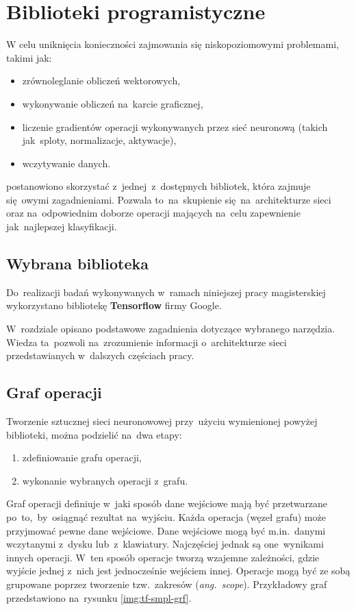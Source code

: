 \chapter{Biblioteki programistyczne}
W celu uniknięcia konieczności zajmowania się niskopoziomowymi problemami, takimi jak:
\begin{itemize}
    \item zrównoleglanie obliczeń wektorowych,
    \item wykonywanie obliczeń na~karcie graficznej,
    \item liczenie gradientów operacji wykonywanych przez sieć neuronową (takich jak~sploty, normalizacje, aktywacje),
    \item wczytywanie danych.
\end{itemize}
postanowiono skorzystać z~jednej~z~dostępnych bibliotek, która zajmuje się~owymi zagadnieniami. Pozwala to~na~skupienie
się~na~architekturze sieci oraz na~odpowiednim doborze operacji mających na~celu zapewnienie jak~najlepszej
klasyfikacji.

\section{Wybrana biblioteka}
Do~realizacji badań wykonywanych w~ramach niniejszej pracy magisterskiej wykorzystano bibliotekę
\textbf{Tensorflow} firmy Google.

W~rozdziale opisano podstawowe zagadnienia dotyczące wybranego narzędzia. Wiedza ta~pozwoli na~zrozumienie
informacji o~architekturze sieci przedstawianych w~dalszych częściach pracy.

\section{Graf operacji}
Tworzenie sztucznej sieci neuronowowej przy~użyciu wymienionej powyżej biblioteki, można podzielić na~dwa etapy:
\begin{enumerate}
    \item zdefiniowanie grafu operacji,
    \item wykonanie wybranych operacji z~grafu.
\end{enumerate}

Graf operacji definiuje w~jaki sposób dane wejściowe mają być przetwarzane po~to,~by~osiągnąć rezultat na~wyjściu.
Każda operacja (węzeł grafu) może przyjmować pewne dane wejściowe. Dane wejściowe mogą być m.in.~danymi wczytanymi
z~dysku lub~z~klawiatury. Najczęściej jednak są one~wynikami innych operacji. W~ten sposób operacje tworzą wzajemne
zależności, gdzie wyjście jednej z~nich jest jednocześnie wejściem innej. Operacje mogą być ze sobą grupowane poprzez
tworzenie tzw.~zakresów (\textit{ang.~scope}). Przykładowy graf przedstawiono na~rysunku \ref{img:tf-smpl-grf}.

